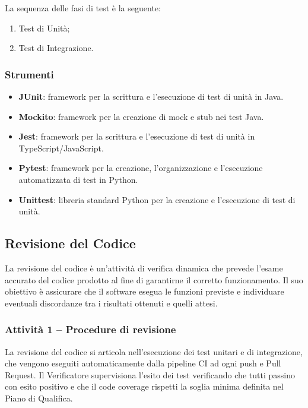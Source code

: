 \documentclass[a4paper, 11pt, oneside]{scrartcl}
\begin{document}
La sequenza delle fasi di test è la seguente:
\begin{enumerate}
    \item Test di Unità;
    \item Test di Integrazione.
\end{enumerate}

\subsubsection{Strumenti}
\begin{itemize}
    \item \textbf{JUnit}: framework per la scrittura e l'esecuzione di test di unità in Java.
    \item \textbf{Mockito}: framework per la creazione di mock e stub nei test Java.
    \item \textbf{Jest}: framework per la scrittura e l'esecuzione di test di unità in TypeScript/JavaScript.
    \item \textbf{Pytest}: framework per la creazione, l'organizzazione e l'esecuzione automatizzata di test in Python.
    \item \textbf{Unittest}: libreria standard Python per la creazione e l'esecuzione di test di unità.
\end{itemize}

\subsection{Revisione del Codice}
\label{sec:revisione_codice}

La revisione del codice è un'attività di verifica dinamica che prevede l'esame accurato del codice prodotto al fine di garantirne il corretto funzionamento. Il suo obiettivo è assicurare che il software{\scriptsize{}} esegua le funzioni previste e individuare eventuali discordanze tra i risultati ottenuti e quelli attesi.

\subsubsection{Attività 1 -- Procedure di revisione}

La revisione del codice si articola nell'esecuzione dei test unitari e di integrazione, che vengono eseguiti automaticamente dalla pipeline CI ad ogni push e Pull Request. Il Verificatore supervisiona l'esito dei test verificando che tutti passino con esito positivo e che il code coverage rispetti la soglia minima definita nel Piano di Qualifica{\scriptsize{}}.
\end{document}

